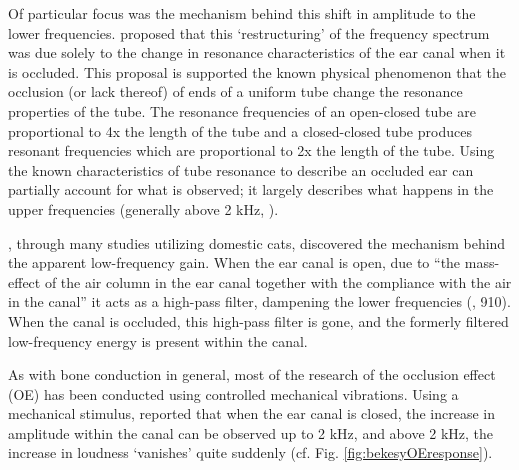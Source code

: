 Of particular focus was the mechanism behind this shift in amplitude to the lower frequencies. \cite{huizing:60} proposed that this `restructuring' of the frequency spectrum was due solely to the change in resonance characteristics of the ear canal when it is occluded.  This proposal is supported the known physical phenomenon that the occlusion (or lack thereof) of ends of a uniform tube change the resonance properties of the tube. The resonance frequencies of an open-closed tube are proportional to 4x the length of the tube and a closed-closed tube produces resonant frequencies which are proportional to 2x the length of the tube.  Using the known characteristics of tube resonance to describe an occluded ear can partially account for what is observed; it largely describes what happens in the upper frequencies (generally above 2 kHz, \cite{stenfelt:03}).  

\cite{tonndorf:66}, through many studies utilizing domestic cats,  discovered the mechanism behind the apparent low-frequency gain.  When the ear canal is open, due to ``the mass-effect of the air column in the ear canal together with the compliance with the air in the canal'' it acts as a high-pass filter, dampening the lower frequencies (\cite{stenfelt:03}, 910).  When the canal is occluded, this high-pass filter is gone, and the formerly filtered low-frequency energy is present within the canal.


 
As with bone conduction in general, most of the research of the occlusion effect (OE) has been conducted using controlled mechanical vibrations.  Using a mechanical stimulus, \cite{bekesy:60} reported that when the ear canal is closed, the increase in amplitude within the canal can be observed up to 2 kHz, and above 2 kHz, the increase in loudness `vanishes' quite suddenly (cf. Fig. \ref{fig:bekesyOEresponse}).

